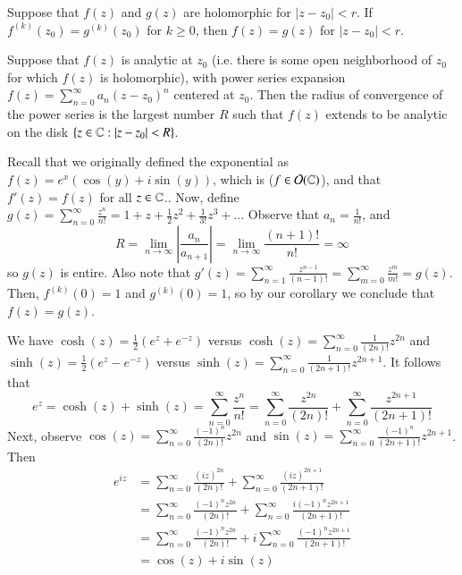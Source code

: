 \documentclass[12pt, a4paper, oneside, openright, titlepage]{book}
\begin{document}
\begin{cor}
    Suppose that $f(z)$ and $g(z)$ are holomorphic for $|z-z_0| < r$. If $f^{(k)}(z_0) = g^{(k)}(z_0)$ for $k \geq 0$, then $f(z) = g(z)$ for $|z-z_0| < r$.
\end{cor}

\begin{cor}
    Suppose that $f(z)$ is analytic at $z_0$ (i.e. there is some open neighborhood of $z_0$ for which $f(z)$ is holomorphic), with power series expansion $f(z) = \sum_{n=0}^{\infty}a_n(z-z_0)^n$ centered at $z_0$. Then the radius of convergence of the power series is the largest number $R$ such that $f(z)$ extends to be analytic on the disk $\{z \in \mathbb C:|z-z_0| < R\}$.
\end{cor}

\begin{eg}
    Recall that we originally defined the exponential as $f(z) = e^x(\cos(y)+i\sin(y))$, which is  ($f \in \mathcal{O}(\mathbb C)$), and that $f'(z) = f(z)$ for all $z \in \mathbb C$.. Now, define $g(z) = \sum_{n=0}^{\infty}\frac{z^n}{n!} = 1+ z + \frac{1}{2}z^2+\frac{1}{3!}z^3+...$ Observe that $a_n = \frac{1}{n!}$, and \begin{equation*}
        R = \lim\limits_{n\rightarrow \infty} \left|\frac{a_n}{a_{n+1}}\right| = \lim\limits_{n\rightarrow \infty} \frac{(n+1)!}{n!} = \infty
    \end{equation*}
    so $g(z)$ is entire. Also note that $g'(z) = \sum_{n=1}^{\infty}\frac{z^{n-1}}{(n-1)!} = \sum_{m=0}^{\infty}\frac{z^m}{m!} = g(z)$. Then, $f^{(k)}(0) = 1$ and $g^{(k)}(0) = 1$, so by our corollary we conclude that $f(z) = g(z)$.
\end{eg}

\begin{eg}
    We have $\cosh(z) = \frac{1}{2}(e^z+e^{-z})$ versus $\cosh(z) = \sum_{n=0}^{\infty}\frac{1}{(2n)!}z^{2n}$ and $\sinh(z) = \frac{1}{2}(e^z - e^{-z})$ versus $\sinh(z) = \sum_{n=0}^{\infty}\frac{1}{(2n+1)!}z^{2n+1}$.  It follows that $$e^z = \cosh(z)+\sinh(z) = \sum_{n=0}^{\infty}\frac{z^n}{n!} = \sum_{n=0}^{\infty}\frac{z^{2n}}{(2n)!} + \sum_{n=0}^{\infty}\frac{z^{2n+1}}{(2n+1)!}$$
    Next, observe $\cos(z) = \sum_{n=0}^{\infty}\frac{(-1)^n}{(2n)!}z^{2n}$ and $\sin(z) =\sum_{n=0}^{\infty}\frac{(-1)^n}{(2n+1)!}z^{2n+1}$. Then \begin{align*}
        e^{iz} &= \sum_{n=0}^{\infty}\frac{(iz)^{2n}}{(2n)!} + \sum_{n=0}^{\infty}\frac{(iz)^{2n+1}}{(2n+1)!} \\
        &= \sum_{n=0}^{\infty}\frac{(-1)^nz^{2n}}{(2n)!} + \sum_{n=0}^{\infty}\frac{i(-1)^nz^{2n+1}}{(2n+1)!} \\
        &= \sum_{n=0}^{\infty}\frac{(-1)^nz^{2n}}{(2n)!} + i\sum_{n=0}^{\infty}\frac{(-1)^nz^{2n+1}}{(2n+1)!} \\
        &= \cos(z)+i\sin(z)
    \end{align*}
\end{eg}
\end{document}
